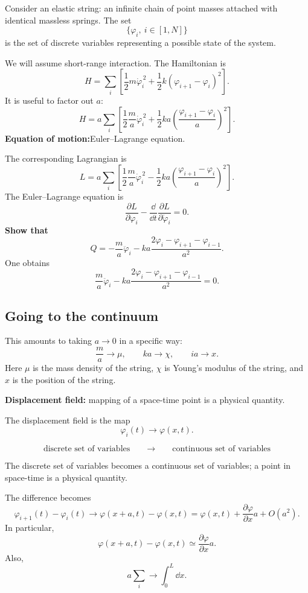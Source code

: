 \documentclass[11pt,a4paper]{article}
\begin{document}
Consider an elastic string: an infinite chain of point masses attached with identical massless springs. The set
\[
\{\varphi_i,\ i\in[1,N]\}
\]
is the set of discrete variables representing a possible state of the system.

We will assume short-range interaction. The Hamiltonian is
\[
H=\sum_i\left[
\frac12m\dot\varphi_i^{\,2}
+\frac12k(\varphi_{i+1}-\varphi_i)^2
\right].
\]
It is useful to factor out $a$:
\[
H=a\sum_i\left[
\frac12\frac{m}{a}\dot\varphi_i^{\,2}
+\frac12ka
\left(\frac{\varphi_{i+1}-\varphi_i}{a}\right)^2
\right].
\]
\textbf{Equation of motion:}\quad Euler--Lagrange equation.

The corresponding Lagrangian is
\[
L=a\sum_i\left[
\frac12\frac{m}{a}\dot\varphi_i^{\,2}
-\frac12ka
\left(\frac{\varphi_{i+1}-\varphi_i}{a}\right)^2
\right].
\]
The Euler--Lagrange equation is
\[
\frac{\partial L}{\partial\varphi_i}
-\frac{\dd}{\dd t}
\frac{\partial L}{\partial\dot\varphi_i}=0.
\]
\textbf{Show that}
\[
Q=-\frac{m}{a}\ddot\varphi_i
-ka\frac{2\varphi_i-\varphi_{i+1}-\varphi_{i-1}}{a^2}.
\]
One obtains
\[
\frac{m}{a}\ddot\varphi_i
-ka\frac{2\varphi_i-\varphi_{i+1}-\varphi_{i-1}}{a^2}=0.
\]

\subsection*{Going to the continuum}

This amounts to taking $a\to0$ in a specific way:
\[
\frac{m}{a}\longrightarrow\mu,
\qquad
ka\longrightarrow\chi,
\qquad
ia\longrightarrow x.
\]
Here $\mu$ is the mass density of the string, $\chi$ is Young's modulus of the string, and $x$ is the position of the string.

\textbf{Displacement field:} mapping of a space-time point is a physical quantity.

The displacement field is the map
\[
\varphi_i(t)\longrightarrow\varphi(x,t).
\]
\begin{center}
\[
\text{discrete set of variables}
\qquad\longrightarrow\qquad
\text{continuous set of variables}
\]
\end{center}
The discrete set of variables becomes a continuous set of variables; a point in space-time is a physical quantity.

The difference becomes
\[
\varphi_{i+1}(t)-\varphi_i(t)
\longrightarrow
\varphi(x+a,t)-\varphi(x,t)
=\varphi(x,t)+\frac{\partial\varphi}{\partial x}a+O(a^2).
\]
In particular,
\[
\varphi(x+a,t)-\varphi(x,t)\simeq\frac{\partial\varphi}{\partial x}a.
\]
Also,
\[
a\sum_i\longrightarrow\int_0^L\dd x.
\]
\end{document}
